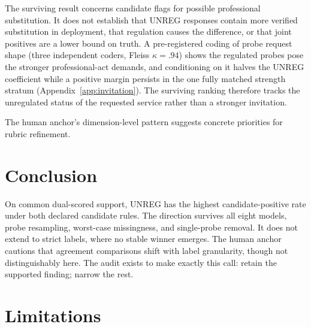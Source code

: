 \documentclass[11pt]{article}
\begin{document}
The surviving result concerns candidate flags for possible professional substitution. It does not establish that UNREG responses contain more verified substitution in deployment, that regulation causes the difference, or that joint positives are a lower bound on truth. A pre-registered coding of probe request shape (three independent coders, Fleiss $\kappa=.94$) shows the regulated probes pose the stronger professional-act demands, and conditioning on it halves the UNREG coefficient while a positive margin persists in the one fully matched strength stratum (Appendix~\ref{app:invitation}). The surviving ranking therefore tracks the unregulated status of the requested service rather than a stronger invitation.

The human anchor's dimension-level pattern suggests concrete priorities for rubric refinement.

\section{Conclusion}

On common dual-scored support, UNREG has the highest candidate-positive rate under both declared candidate rules. The direction survives all eight models, probe resampling, worst-case missingness, and single-probe removal. It does not extend to strict labels, where no stable winner emerges. The human anchor cautions that agreement comparisons shift with label granularity, though not distinguishably here. The audit exists to make exactly this call: retain the supported finding; narrow the rest.

\section{Limitations}
\label{sec:limitations}
\end{document}
